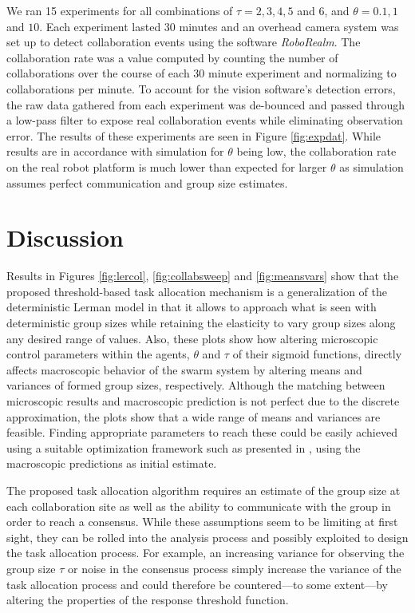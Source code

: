 \documentclass{TeXstyles/DARS/svmult}  %
\begin{document}
We ran 15 experiments for all combinations of $\tau = 2,3,4,5$ and $6$, and $\theta = 0.1, 1$ and $10$. Each experiment lasted 30 minutes and an overhead camera system was set up to detect collaboration events using the software \emph{RoboRealm}. The collaboration rate was a value computed by counting the number of collaborations over the course of each 30 minute experiment and normalizing to collaborations per minute. 
To account for the vision software's detection errors, the raw data gathered from each experiment was de-bounced and passed through a low-pass filter to expose real collaboration events while eliminating observation error. The results of these experiments are seen in Figure \ref{fig:expdat}. While results are in accordance with simulation for $\theta$ being low, the collaboration rate on the real robot platform is much lower than expected for larger $\theta$ as simulation assumes perfect communication and group size estimates.


\section{Discussion}\label{sec:discussion}
Results in Figures \ref{fig:lercol}, \ref{fig:collabsweep} and \ref{fig:meansvars} show that the proposed threshold-based task allocation mechanism is a generalization of the deterministic Lerman model in that it allows to approach what is seen with deterministic group sizes while retaining the elasticity to vary group sizes along any desired range of values. Also, these plots show how altering microscopic control parameters within the agents, $\theta$ and $\tau$ of their sigmoid functions, directly affects macroscopic behavior of the swarm system by altering means and variances of formed group sizes, respectively. Although the matching between microscopic results and macroscopic prediction is not perfect due to the discrete approximation, the plots show that a wide range of means and variances are feasible. Finding appropriate parameters to reach these could be easily achieved using a suitable optimization framework such as presented in \cite{Correll2008,Berman2009}, using the macroscopic predictions as initial estimate. 

The proposed task allocation algorithm requires an estimate of the group size at each collaboration site as well as the ability to communicate with the group in order to reach a consensus. While these assumptions seem to be limiting at first sight, they can be rolled into the analysis process and possibly exploited to design the task allocation process. For example, an increasing variance for observing the group size $\tau$ or noise in the consensus process simply increase the variance of the task allocation process and could therefore be countered---to some extent---by altering the properties of the response threshold function. 
\end{document}
